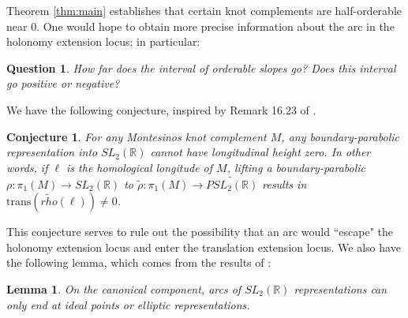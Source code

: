 \documentclass{article}
\theoremstyle{plain}
\theoremstyle{definition}
\theoremstyle{plain}
\theoremstyle{plain}
\theoremstyle{plain}
\newtheorem{lemma}[theorem]{Lemma}
\theoremstyle{remark}
\theoremstyle{remark}
\theoremstyle{plain}
\newtheorem{conjecture}[theorem]{Conjecture}
\theoremstyle{plain}
\newtheorem{question}[theorem]{Question}
\begin{document}
Theorem \ref{thm:main} establishes that certain knot complements are half-orderable near 0. One would hope to obtain more precise information about the arc in the holonomy extension locus; in particular:

\begin{question}
How far does the interval of orderable slopes go? Does this interval go positive or negative?
\end{question} 

We have the following conjecture, inspired by Remark 16.23 of \cite{dunfieldrasmussen}.

\begin{conjecture}
For any Montesinos knot complement $M$, any boundary-parabolic representation into $SL_2(\mathbb{R})$ cannot have longitudinal height zero. In other words, if $\ell$ is the homological longitude of $M$, lifting a boundary-parabolic $\rho: \pi_1(M) \to SL_2(\mathbb{R})$ to $\widetilde{\rho}: \pi_1(M) \to \widetilde{PSL_2(\mathbb{R})}$ results in $\text{trans}(\widetilde{rho}(\ell)) \neq 0$. 
\end{conjecture}


This conjecture serves to rule out the possibility that an arc would ``escape" the holonomy extension locus and enter the translation extension locus. We also have the following lemma, which comes from the results of \cite{Dunfield1999CyclicSD}:

\begin{lemma}
On the canonical component, arcs of $SL_2(\mathbb{R})$ representations can only end at ideal points or elliptic representations.
\end{lemma}

\end{document}
